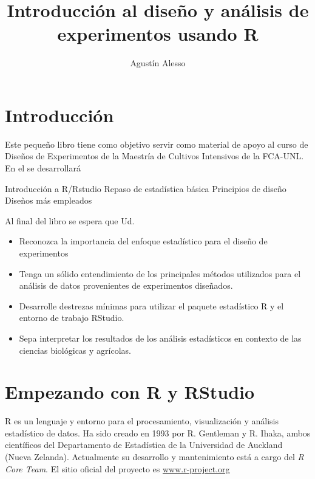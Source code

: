 \documentclass[a4paper]{book}
\title{Introducción al diseño y análisis de experimentos usando R}
\author{Agustín Alesso}
\date{}
\providecommand{\tightlist}{%
  \setlength{\itemsep}{0pt}\setlength{\parskip}{0pt}}
\begin{document}
\maketitle

{
\setcounter{tocdepth}{1}
\tableofcontents
}
\hypertarget{introduccion}{%
\chapter*{Introducción}\label{introduccion}}

Este pequeño libro tiene como objetivo servir como material de apoyo al
curso de Diseños de Experimentos de la Maestría de Cultivos Intensivos
de la FCA-UNL. En el se desarrollará

Introducción a R/Rstudio Repaso de estadística básica Principios de
diseño Diseǹos más empleados

Al final del libro se espera que Ud.

\begin{itemize}
\tightlist
\item
  Reconozca la importancia del enfoque estadístico para el diseño de
  experimentos
\item
  Tenga un sólido entendimiento de los principales métodos utilizados
  para el análisis de datos provenientes de experimentos diseñados.
\item
  Desarrolle destrezas mínimas para utilizar el paquete estadístico R y
  el entorno de trabajo RStudio.
\item
  Sepa interpretar los resultados de los análisis estadísticos en
  contexto de las ciencias biológicas y agrícolas.
\end{itemize}

\hypertarget{empezando-con-r-y-rstudio}{%
\chapter{Empezando con R y RStudio}\label{empezando-con-r-y-rstudio}}

R es un lenguaje y entorno para el procesamiento, visualización y
análisis estadístico de datos. Ha sido creado en 1993 por R. Gentleman y
R. Ihaka, ambos científicos del Departamento de Estadística de la
Universidad de Auckland (Nueva Zelanda). Actualmente su desarrollo y
mantenimiento está a cargo del \emph{R Core Team}. El sitio oficial del
proyecto es \url{www.r-project.org}
\end{document}
